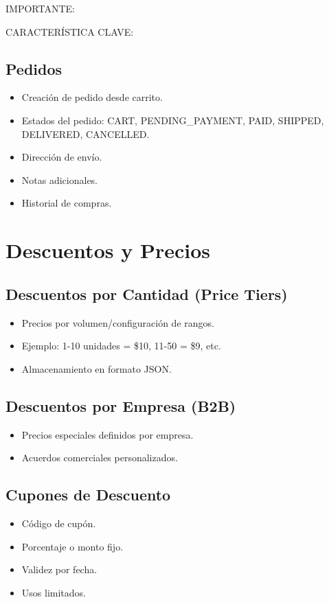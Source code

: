 \documentclass[12pt,a4paper,oneside]{book}
\begin{document}
\begin{alert}{IMPORTANTE:}
\begin{info}{CARACTERÍSTICA CLAVE:}
\subsection{Pedidos}
\begin{itemize}
    \item Creación de pedido desde carrito.
    \item Estados del pedido: CART, PENDING\_PAYMENT, PAID, SHIPPED, DELIVERED, CANCELLED.
    \item Dirección de envío.
    \item Notas adicionales.
    \item Historial de compras.
\end{itemize}

\section{Descuentos y Precios}
\label{sec:descuentos}

\subsection{Descuentos por Cantidad (Price Tiers)}
\begin{itemize}
    \item Precios por volumen/configuración de rangos.
    \item Ejemplo: 1-10 unidades = \$10, 11-50 = \$9, etc.
    \item Almacenamiento en formato JSON.
\end{itemize}

\subsection{Descuentos por Empresa (B2B)}
\begin{itemize}
    \item Precios especiales definidos por empresa.
    \item Acuerdos comerciales personalizados.
\end{itemize}

\subsection{Cupones de Descuento}
\begin{itemize}
    \item Código de cupón.
    \item Porcentaje o monto fijo.
    \item Validez por fecha.
    \item Usos limitados.
\end{itemize}


\end{info}
\end{alert}
\end{document}
